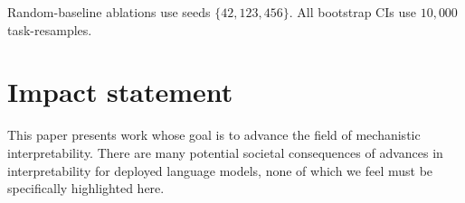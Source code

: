 \documentclass{article}
\theoremstyle{plain}
\theoremstyle{definition}
\theoremstyle{remark}
\begin{document}
Random-baseline ablations use seeds $\{42, 123, 456\}$. All bootstrap CIs use $10{,}000$ task-resamples.

\section*{Impact statement}
This paper presents work whose goal is to advance the field of mechanistic interpretability. There are many potential societal consequences of advances in interpretability for deployed language models, none of which we feel must be specifically highlighted here.
\end{document}
